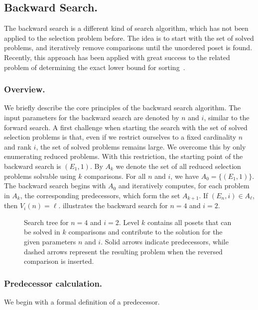 \documentclass[a4paper,UKenglish,cleveref, autoref, thm-restate]{lipics-v2021}
\begin{document}
\subsection{Backward Search.} \label{sec:backward}
The backward search is a different kind of search algorithm, which has not been applied to the selection problem before.
The idea is to start with the set of solved problems, and iteratively remove comparisons until the unordered poset is found.
Recently, this approach has been applied with great success to the related problem of determining the exact lower bound for sorting~\cite{stober2022lower}.

\subsubsection{Overview.} \label{sec:backward:algorithm}
We briefly describe the core principles of the backward search algorithm.
The input parameters for the backward search are denoted by $n$ and $i$, similar to the forward search.
A first challenge when starting the search with the set of solved selection problems is that, even if we restrict ourselves to a fixed cardinality $n$ and rank $i$, the set of solved problems remains large.
We overcome this by only enumerating reduced problems.
With this restriction, the starting point of the backward search is $(E_1, 1)$.
By $A_k$ we denote the set of all reduced selection problems solvable using $k$ comparisons.
For all $n$ and $i$, we have $A_0 = \{(E_1, 1)\}$.
The backward search begins with $A_0$ and iteratively computes, for each problem in $A_k$, the corresponding predecessors, which form the set $A_{k + 1}$.
If $(E_n, i) \in A_\ell$, then $V_i(n) = \ell$.
 illustrates the backward search for $n = 4$ and $i = 2$.

\begin{figure}[t]
  \centering
  
  \caption{Search tree for $n = 4$ and $i = 2$.
    Level $k$ contains all posets that can be solved in $k$ comparisons and contribute to the solution for the given parameters $n$ and $i$.
    Solid arrows indicate predecessors, while dashed arrows represent the resulting problem when the reversed comparison is inserted.}
  \label{fig:backward-search-tree}
\end{figure}


\subsubsection{Predecessor calculation.} \label{sec:backward:predecessor_calculation}
We begin with a formal definition of a predecessor.
\end{document}
